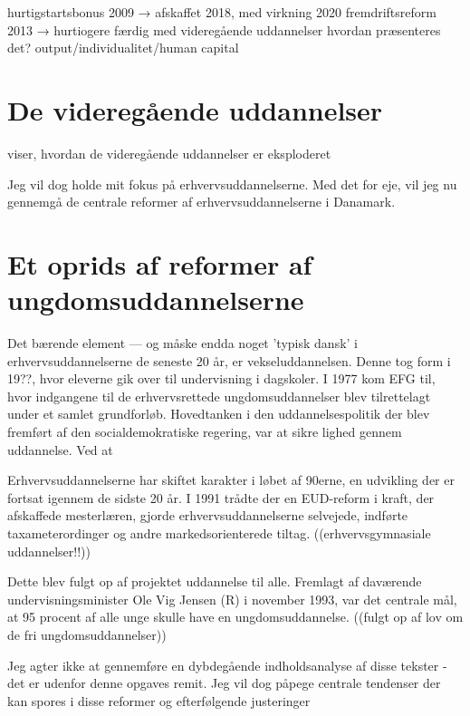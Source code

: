 hurtigstartsbonus 2009 → afskaffet 2018, med virkning 2020
fremdriftsreform 2013 → hurtiogere færdig med videregående uddannelser
hvordan præsenteres det? output/individualitet/human capital
\section{De videregående uddannelser}
\autocite{schoferWorldwideExpansionHigher2005} viser, hvordan de videregående uddannelser er eksploderet 

Jeg vil dog holde mit fokus på erhvervsuddannelserne.
Med det for eje, vil jeg nu gennemgå de centrale reformer af erhvervsuddannelserne i Danamark.
\section{Et oprids af reformer af ungdomsuddannelserne}
Det bærende element --- og måske endda noget 'typisk dansk' i erhvervsuddannelserne de seneste 20 år, er vekseluddannelsen.
Denne tog form i 19??, hvor eleverne gik over til undervisning i dagskoler.
I 1977 kom EFG til, hvor indgangene til de erhvervsrettede ungdomsuddannelser blev tilrettelagt under et samlet grundforløb.
Hovedtanken i den uddannelsespolitik der blev fremført af den socialdemokratiske regering, var at sikre lighed gennem uddannelse.
Ved at 

Erhvervsuddannelserne har skiftet karakter i løbet af 90erne, en udvikling der er fortsat igennem de sidste 20 år.
I 1991 trådte der en EUD-reform i kraft, der afskaffede mesterlæren, gjorde erhvervsuddannelserne selvejede, indførte taxameterordinger og andre markedsorienterede tiltag.
((erhvervsgymnasiale uddannelser!!))


Dette blev fulgt op af projektet uddannelse til alle.
Fremlagt af daværende undervisningsminister Ole Vig Jensen (R) i november 1993, var det centrale mål, at 95 procent af alle unge skulle have en ungdomsuddannelse.
((fulgt op af lov om de fri ungdomsuddannelser))

Jeg agter ikke at gennemføre en dybdegående indholdsanalyse af disse tekster - det er udenfor denne opgaves remit.
Jeg vil dog påpege centrale tendenser der kan spores i disse reformer og efterfølgende justeringer
